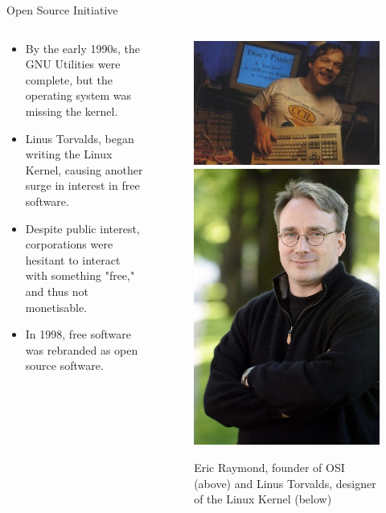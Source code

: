 \documentclass[9pt, dvipsnames]{beamer}
\begin{document}
\begin{frame}{Open Source Initiative}
    \begin{columns}
        \begin{column}{0.5\textwidth}
            \begin{itemize}
                \item By the early 1990s, the GNU Utilities were complete, but
                the operating system was missing the kernel.
                \item Linus Torvalds, began writing the Linux Kernel, causing
                another surge in interest in free software.
                \item Despite public interest, corporations were hesitant to
                interact with something "free," and thus not monetisable.
                \item In 1998, free software was rebranded as open source
                software. 
            \end{itemize}
        \end{column}
        \begin{column}{0.5\textwidth}
            \begin{figure}
                \centering
                \includegraphics[width=0.7\linewidth]{assets/raymond.jpg}
                \includegraphics[width=0.3\linewidth]{assets/torvalds.jpg}
                \caption{Eric Raymond, founder of OSI (above) and Linus
                Torvalds, designer of the Linux Kernel (below)}
            \end{figure}
        \end{column}
    \end{columns}
\end{frame}
\end{document}
